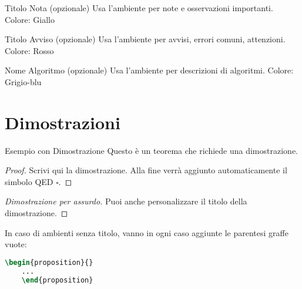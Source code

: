 \documentclass{csnotes}
\begin{document}
\begin{note}{Titolo Nota (opzionale)}
Usa l'ambiente  per note e osservazioni importanti.
Colore: Giallo
\end{note}

\begin{warning}{Titolo Avviso (opzionale)}
Usa l'ambiente  per avvisi, errori comuni, attenzioni.
Colore: Rosso
\end{warning}

\begin{algorithmdesc}{Nome Algoritmo (opzionale)}
Usa l'ambiente  per descrizioni di algoritmi.
Colore: Grigio-blu
\end{algorithmdesc}


\section{Dimostrazioni}

\begin{theorem}[label=thm:esempio]{Esempio con Dimostrazione}
Questo è un teorema che richiede una dimostrazione.
\end{theorem}

\begin{proof}
Scrivi qui la dimostrazione. Alla fine verrà aggiunto automaticamente
il simbolo QED \(\square\).
\end{proof}

\begin{proof}[Dimostrazione per assurdo]
Puoi anche personalizzare il titolo della dimostrazione.
\end{proof}

\begin{warning}{}
  In caso di ambienti senza titolo, vanno in ogni caso aggiunte le parentesi graffe vuote:
  \begin{lstlisting}[language=TeX]
    \begin{proposition}{}
    ...
    \end{proposition}
  \end{lstlisting}
\end{warning}

\end{document}
